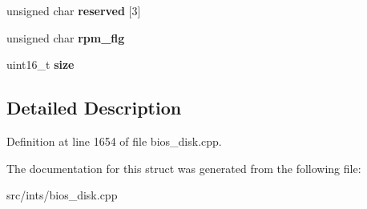 \begin{DoxyCompactItemize}
\item 
\hypertarget{structD88SEC_ae71af3325f276f748b4966972fd3832c}{unsigned char {\bfseries reserved} \mbox{[}3\mbox{]}}\label{structD88SEC_ae71af3325f276f748b4966972fd3832c}

\item 
\hypertarget{structD88SEC_a2bfa52815aee40f7c5383a0a51175aa3}{unsigned char {\bfseries rpm\-\_\-flg}}\label{structD88SEC_a2bfa52815aee40f7c5383a0a51175aa3}

\item 
\hypertarget{structD88SEC_af830ea69e2aa174d018743dfbc12edce}{uint16\-\_\-t {\bfseries size}}\label{structD88SEC_af830ea69e2aa174d018743dfbc12edce}

\end{DoxyCompactItemize}


\subsection{Detailed Description}


Definition at line 1654 of file bios\-\_\-disk.\-cpp.



The documentation for this struct was generated from the following file\-:\begin{DoxyCompactItemize}
\item 
src/ints/bios\-\_\-disk.\-cpp\end{DoxyCompactItemize}
